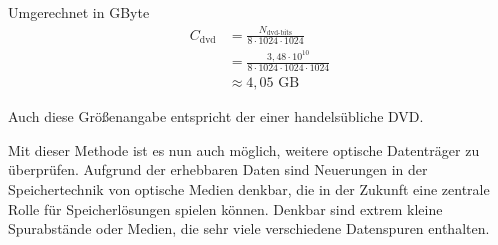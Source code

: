 \documentclass[9pt,twocolumn,twoside]{pnas-new}
\begin{document}
Umgerechnet in GByte
\begin{align*}
C_{\mbox{dvd}} &= \frac{N_{\mbox{dvd-bits}}}{8\cdot1024\cdot1024}\\
&= \frac{3,48\cdot10^{10}}{8\cdot1024\cdot1024\cdot1024}\\
&\approx 4,05\mbox{ GB}
\end{align*}

Auch diese Größenangabe entspricht der einer handelsübliche DVD.


Mit dieser Methode ist es nun auch möglich, weitere optische Datenträger zu überprüfen.
Aufgrund der erhebbaren Daten sind Neuerungen in der Speichertechnik von optische Medien denkbar, die in der Zukunft eine zentrale Rolle für Speicherlösungen spielen können.
Denkbar sind extrem kleine Spurabstände oder Medien, die sehr viele verschiedene Datenspuren enthalten.




\end{document}

